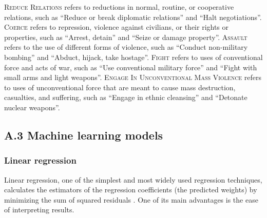 \documentclass{bmcart}
\begin{document}
{\scshape Reduce Relations} refers to reductions in normal, routine, or cooperative relations, such as ``Reduce or break diplomatic relations'' and ``Halt negotiations''.
{\scshape Coerce} refers to repression, violence against civilians, or their rights or properties, such as ``Arrest, detain'' and ``Seize or damage property''.
{\scshape Assault} refers to the use of different forms of violence, such as ``Conduct non-military bombing'' and ``Abduct, hijack, take hostage''.
{\scshape Fight} refers to uses of conventional force and acts of war, such as ``Use conventional military force'' and ``Fight with small arms and light weapons''.
{\scshape Engage In Unconventional Mass Violence} refers to uses of unconventional force that are meant to cause mass destruction, casualties, and suffering, such as ``Engage in ethnic cleansing'' and ``Detonate nuclear weapons''.

\subsection*{\textbf{A.3 Machine learning models}}
\label{appendix3}

\subsubsection*{\textbf{Linear regression}}
Linear regression, one of the simplest and most widely used regression techniques, calculates the estimators of the regression coefficients (the predicted weights) by minimizing the sum of squared residuals \cite{james2013introduction}. 
One of its main advantages is the ease of interpreting results.
\end{document}
